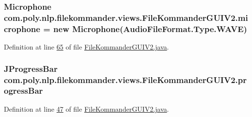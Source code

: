 \hypertarget{classcom_1_1poly_1_1nlp_1_1filekommander_1_1views_1_1_file_kommander_g_u_i_v2_aa4fb86851a7d16c0aed54ffa2a4d494a}{
\subsubsection[{microphone}]{\setlength{\rightskip}{0pt plus 5cm}Microphone com.\-poly.\-nlp.\-filekommander.\-views.\-File\-Kommander\-G\-U\-I\-V2.\-microphone = new Microphone(Audio\-File\-Format.\-Type.\-W\-A\-V\-E)\hspace{0.3cm}{\ttfamily [protected]}}}\label{classcom_1_1poly_1_1nlp_1_1filekommander_1_1views_1_1_file_kommander_g_u_i_v2_aa4fb86851a7d16c0aed54ffa2a4d494a}


Definition at line \hyperlink{L65}{65} of file \hyperlink{}{File\-Kommander\-G\-U\-I\-V2.\-java}.

\hypertarget{classcom_1_1poly_1_1nlp_1_1filekommander_1_1views_1_1_file_kommander_g_u_i_v2_a610f5e81072e2d7e81ddd92bcd098295}{
\subsubsection[{progress\-Bar}]{\setlength{\rightskip}{0pt plus 5cm}J\-Progress\-Bar com.\-poly.\-nlp.\-filekommander.\-views.\-File\-Kommander\-G\-U\-I\-V2.\-progress\-Bar\hspace{0.3cm}{\ttfamily [private]}}}\label{classcom_1_1poly_1_1nlp_1_1filekommander_1_1views_1_1_file_kommander_g_u_i_v2_a610f5e81072e2d7e81ddd92bcd098295}


Definition at line \hyperlink{L47}{47} of file \hyperlink{}{File\-Kommander\-G\-U\-I\-V2.\-java}.


